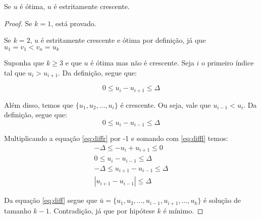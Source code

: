 \begin{prop} \label{salto:cres}
Se $u$ é ótima, $u$ é estritamente crescente.
\end{prop}
\begin{proof}

Se $k = 1$, está provado.

Se $k = 2$, $u$ é estritamente crescente e ótima por definição, já que $u_1 = v_1 < v_n = u_{k}$

Suponha que $k \geq 3$ e que $u$ é ótima mas não é crescente. Seja $i$ o primeiro índice tal que $u_{i} > u_{i + 1}$. Da definição, segue que:

\begin{equation} \label{eq:diffr}
0 \leq u_i - u_{i + 1} \leq \Delta
\end{equation}

Além disso, temos que $\{u_1, u_2, ..., u_i\}$ é crescente. Ou seja, vale que $u_{i - 1} < u_i$. Da definição, segue que:
\begin{equation} \label{eq:diffl}
0 \leq u_i - u_{i - 1} \leq \Delta
\end{equation}

Multiplicando a equação \ref{eq:diffr} por -1 e somando com \ref{eq:diffl} temos:
\begin{align}  \label{eq:diff}
-\Delta \leq - u_i + u_{i + 1} \leq 0 \nonumber \\
0 \leq u_i - u_{i - 1} \leq \Delta \nonumber \\
-\Delta \leq u_{i + 1} - u_{i - 1} \leq \Delta \nonumber \\
|u_{i + 1} - u_{i - 1}| \leq \Delta
\end{align}

Da equação \ref{eq:diff} segue que $\bar{u} = \{u_1, u_2, ..., u_{i - 1}, u_{i + 1}, ..., u_k\}$ é solução de tamanho $k - 1$. Contradição, já que por hipótese $k$ é mínimo.

\end{proof}

